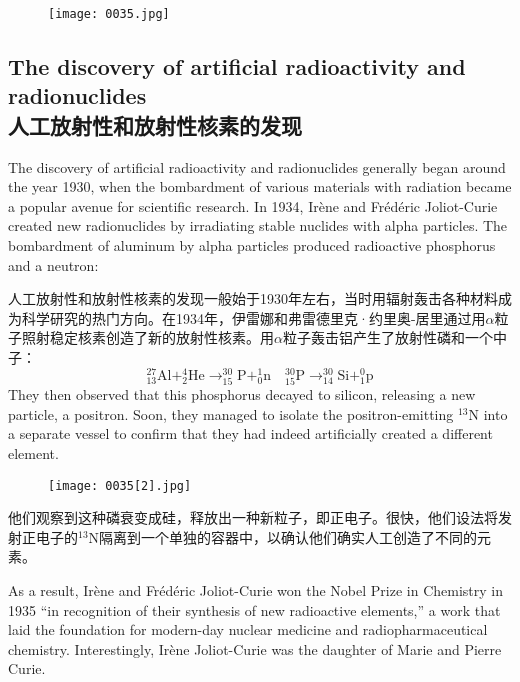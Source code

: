 \documentclass[dvipsnames, svgnames,a4paper,11pt]{article}
\begin{document}
\begin{figure}[htbp]
      \centering
      \texttt{[image: 0035.jpg]}
       \label{fig24}
\end{figure}

\subsection{The discovery of artificial radioactivity and radionuclides\\人工放射性和放射性核素的发现}

The discovery of artificial radioactivity and radionuclides generally began around the year 1930, when the bombardment of various materials with radiation became a popular avenue for scientific research. In 1934, Irène and Frédéric Joliot-Curie created new radionuclides by irradiating stable nuclides with alpha particles. The bombardment of aluminum by alpha particles produced radioactive phosphorus and a neutron:

人工放射性和放射性核素的发现一般始于1930年左右，当时用辐射轰击各种材料成为科学研究的热门方向。在1934年，伊雷娜和弗雷德里克·约里奥-居里通过用$\alpha$粒子照射稳定核素创造了新的放射性核素。用$\alpha$粒子轰击铝产生了放射性磷和一个中子：
$$\mathrm{_{13}^{27}Al+_2^4He\to_{15}^{30}P+_0^1n \quad _{15}^{30}P\to_{14}^{30}Si+_1^0p}$$
They then observed that this phosphorus decayed to silicon, releasing a new particle, a positron. Soon, they managed to isolate the positron-emitting  ${}^{13}$N into a separate vessel to confirm that they had indeed artificially created a different element.

\begin{figure}[htbp]
      \centering
      \texttt{[image: 0035[2].jpg]}
       \label{fig25}
\end{figure}

他们观察到这种磷衰变成硅，释放出一种新粒子，即正电子。很快，他们设法将发射正电子的${}^{13}$N隔离到一个单独的容器中，以确认他们确实人工创造了不同的元素。

As a result, Irène and Frédéric Joliot-Curie won the Nobel Prize in Chemistry in 1935 “in recognition of their synthesis of new radioactive elements,” a work that laid the foundation for modern-day nuclear medicine and radiopharmaceutical chemistry. Interestingly, Irène Joliot-Curie was the daughter of Marie and Pierre Curie.
\end{document}

